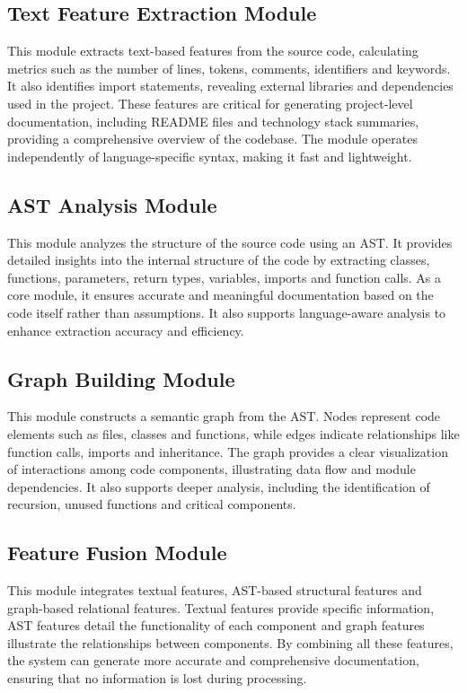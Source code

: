 \subsection{Text Feature Extraction Module}
\hspace{0.5cm}
This module extracts text-based features from the source code, calculating metrics such as the number of lines, tokens, comments, identifiers and keywords. It also identifies import statements, revealing external libraries and dependencies used in the project. These features are critical for generating project-level documentation, including README files and technology stack summaries, providing a comprehensive overview of the codebase. The module operates independently of language-specific syntax, making it fast and lightweight.

\subsection{AST Analysis Module}
\hspace{0.5cm}
This module analyzes the structure of the source code using an AST. It provides detailed insights into the internal structure of the code by extracting classes, functions, parameters, return types, variables, imports and function calls. As a core module, it ensures accurate and meaningful documentation based on the code itself rather than assumptions. It also supports language-aware analysis to enhance extraction accuracy and efficiency.

\subsection{Graph Building Module}
\hspace{0.5cm}
This module constructs a semantic graph from the AST. Nodes represent code elements such as files, classes and functions, while edges indicate relationships like function calls, imports and inheritance. The graph provides a clear visualization of interactions among code components, illustrating data flow and module dependencies. It also supports deeper analysis, including the identification of recursion, unused functions and critical components.

\subsection{Feature Fusion Module}
\hspace{0.5cm}
This module integrates textual features, AST-based structural features and graph-based relational features. Textual features provide specific information, AST features detail the functionality of each component and graph features illustrate the relationships between components. By combining all these features, the system can generate more accurate and comprehensive documentation, ensuring that no information is lost during processing.

